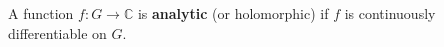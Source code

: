 A function $f: G \to \mathbb{C}$ is \textbf{analytic} (or holomorphic) if $f$ is continuously differentiable on $G$.
